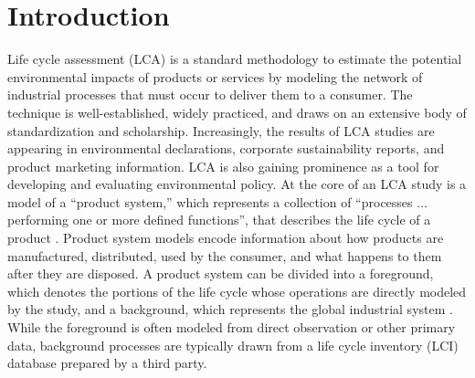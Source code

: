 \section{Introduction}

Life cycle assessment (LCA) is a standard methodology to estimate the potential environmental impacts of products or services by modeling the network of industrial processes that must occur to deliver %
them to a consumer.  The technique is well-established, widely practiced, and draws on an extensive body of standardization and scholarship.
Increasingly, the results of LCA studies are appearing in environmental declarations, corporate sustainability reports, and product marketing information.  LCA is also gaining prominence as a tool for developing and evaluating environmental policy.  
%
At the core of an LCA study is a model of a ``product system,'' which represents a collection of ``processes $\ldots$ performing one or more defined functions'', that describes the life cycle of a product \citep{iso14044}.  Product system models encode information about how products are manufactured, distributed, used by the consumer, and what happens to them after they are disposed.  A product system can be divided into a foreground, which denotes the portions of the life cycle whose operations are directly modeled by the study, and a background, which represents the global industrial system \citep{SETAC_inventory_1998}.  While the foreground is often modeled from direct observation or other primary data, background processes are typically drawn from a life cycle inventory (LCI) database prepared by a third party.

